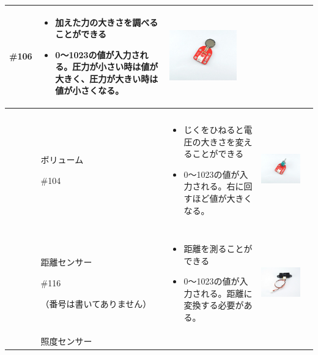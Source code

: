 \documentclass[a4paper,dvipdfmx]{jarticle}
\begin{document}
\begin{flushleft}
\begin{supertabular}{|m{2.34cm}|m{2.658cm}|m{6.4090004cm}|m{3.672cm}|m{1.211cm}|}
{\mdseries \#106} &
\begin{itemize}
\item
加えた力の大きさを調べることができる
\item
0〜1023の値が入力される。圧力が小さい時は値が大きく、圧力が大きい時は値が小さくなる。
\end{itemize}
 &
\centering
\includegraphics[width=2.92cm,height=2.627cm]{text05-img/text05-img020.jpg}
 &
{\mdseries \pageref{bkm:RefHeadingToc25711508239293}}\\\hline
 &
{\mdseries ボリューム}

{\mdseries \#104} &
\begin{itemize}
\item
じくをひねると電圧の大きさを変えることができる
\item
0〜1023の値が入力される。右に回すほど値が大きくなる。
\end{itemize}
 &
 \includegraphics[width=6.858cm,height=5.131cm]{text05-img/text05-img021.jpg}  &
{\mdseries \pageref{bkm:RefHeadingToc25713508239293}}\\\hline
 &
{\mdseries 距離センサー}

{\mdseries \#116}

{\mdseries （番号は書いてありません）} &
\begin{itemize}
\item 距離を測ることができる
\item
0〜1023の値が入力される。距離に変換する必要がある。
\end{itemize}
 &
 \includegraphics[width=3.678cm,height=2.736cm]{text05-img/text05-img022.jpg}  &
{\mdseries \pageref{bkm:RefHeadingToc5917367650265}}\\\hline
 &
{\mdseries 照度センサー}


\end{supertabular}
\end{flushleft}
\end{document}
